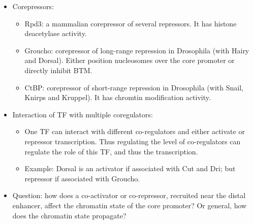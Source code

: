 \documentclass{report}
\begin{document}
\begin{itemize}
	\item Corepressors:
	\begin{itemize}
		\item Rpd3: a mammalian corepressor of several repressors. It has histone deacetylase activity. 
		\item Groucho: corepressor of long-range repression in Drosophila (with Hairy and Dorsal). Either position nucleosomes over the core promoter or directly inhibit BTM. 
		\item CtBP: corepressor of short-range repression in Drosophila (with Snail, Knirps and Kruppel). It has chromtin modification activity.  
	\end{itemize}
	
	\item Interaction of TF with multiple coregulators:
	\begin{itemize}
		\item One TF can interact with different co-regulators and either activate or repressor transcription. Thus regulating the level of co-regulators can regulate the role of this TF, and thus the transcription. 
		\item Example: Dorsal is an activator if associated with Cut and Dri; but repressor if associated with Groucho. 
	\end{itemize} 
	
	\item Question: how does a co-activator or co-repressor, recruited near the distal enhancer, affect the chromatin state of the core promoter? Or general, how does the chromatin state propagate? 
\end{itemize}
\end{document}
